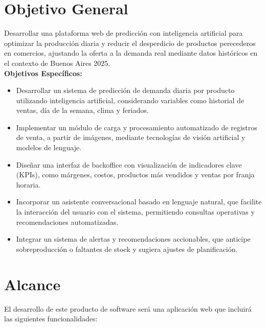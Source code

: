 \section{Objetivo General}

Desarrollar una plataforma web de predicción con inteligencia artificial para optimizar la producción diaria y reducir el desperdicio de productos perecederos en comercios, ajustando la oferta a la demanda real mediante datos históricos en el contexto de Buenos Aires 2025.\\

\noindent\textbf{Objetivos Específicos:}

\begin{itemize}
    \item Desarrollar un sistema de predicción de demanda diaria por producto utilizando inteligencia artificial, considerando variables como historial de ventas, día de la semana, clima y feriados.
    
    \item Implementar un módulo de carga y procesamiento automatizado de registros de venta, a partir de imágenes, mediante tecnologías de visión artificial y modelos de lenguaje.
    
    \item Diseñar una interfaz de backoffice con visualización de indicadores clave (KPIs), como márgenes, costos, productos más vendidos y ventas por franja horaria.
    
    \item Incorporar un asistente conversacional basado en lenguaje natural, que facilite la interacción del usuario con el sistema, permitiendo consultas operativas y recomendaciones automatizadas.
    
    \item Integrar un sistema de alertas y recomendaciones accionables, que anticipe sobreproducción o faltantes de stock y sugiera ajustes de planificación.
    
\end{itemize}

\section{Alcance}

El desarrollo de este producto de software será una aplicación web que incluirá las siguientes funcionalidades:

